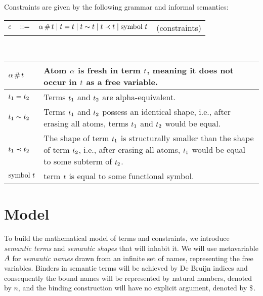 \documentclass[english, mgr]{iithesis}
\renewcommand{\it}[1]{\textit{#1}}
\begin{document}
\pagebreak
Constraints are given by the following grammar and informal semantics:
\\
\begin{tabular}{rclr}
    $c$  & $::=$ & $\alpha \,\#\, t
                   \mid t = t
                   \mid t \sim t
                   \mid t \prec t
                   \mid \text{symbol } t$
        & (constraints)
\end{tabular}
\\
\begin{tabularx}{\linewidth}{|l|X|}
  \hline
  $\alpha \,\#\, t$ & Atom $\alpha$ is fresh in term $t$, meaning it does not occur in $t$ as a free variable. \\
  \hline
  $t_1 = t_2$ & Terms $t_1$ and $t_2$ are alpha-equivalent. \\
  \hline
  $t_1 \sim t_2$ & Terms $t_1$ and $t_2$ possess an identical shape, i.e., after erasing all atoms, terms $t_1$ and $t_2$ would be equal. \\
  \hline
  $t_1 \prec t_2$ & The shape of term $t_1$ is structurally smaller than the shape of term $t_2$, i.e., after erasing all atoms, $t_1$ would be equal to some subterm of $t_2$. \\
  \hline
  $\text{symbol } t$ & term $t$ is equal to some functional symbol. \\
  \hline
\end{tabularx}

\section{Model}
To build the mathematical model of terms and constraints,
we introduce \it{semantic terms} and \it{semantic shapes} that will inhabit it.
We will use metavariable $A$ for \it{semantic names} drawn from an
infinite set of names, representing the free variables.
Binders in semantic terms will be achieved by De Bruijn indices\cite{deBruijn} and consequently
the bound names will be represented by natural numbers, denoted by $n$,
and the binding construction will have no explicit argument, denoted by $\stbind$.
\end{document}
